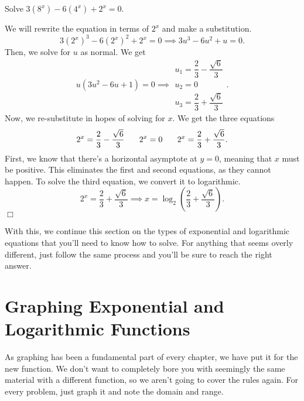 \documentclass[../book.tex]{subfiles}
\begin{document}
\begin{example}
Solve $3(8^x)-6(4^x)+2^x=0$.
\end{example}
\begin{solution}
We will rewrite the equation in terms of $2^x$ and make a substitution.  $$3(2^x)^3-6(2^x)^2+2^x=0 \implies 3u^3-6u^2+u=0.$$  Then, we solve for $u$ as normal.  We get $$u(3u^2-6u+1)=0 \implies \begin{matrix} u_1=\dfrac{2}{3}-\dfrac{\sqrt{6}}{3} \\ u_2=0 \\ u_3=\dfrac{2}{3}+\dfrac{\sqrt{6}}{3} \end{matrix}.$$
Now, we re-substitute in hopes of solving for $x$. We get the three equations $$2^x=\dfrac{2}{3}-\dfrac{\sqrt{6}}{3} \hspace{0.25in} 2^x=0 \hspace{0.25in} 2^x=\dfrac{2}{3}+\dfrac{\sqrt{6}}{3}.$$
First, we know that there's a horizontal asymptote at $y=0$, meaning that $x$ must be positive.  This eliminates the first and second equations, as they cannot happen.  To solve the third equation, we convert it to logarithmic.  $$2^x=\dfrac{2}{3}+\dfrac{\sqrt{6}}{3} \implies x=\log_2\left(\dfrac{2}{3}+\dfrac{\sqrt{6}}{3}\right).$$ $\Box$
\end{solution}
With this, we continue this section on the types of exponential and logarithmic equations that you'll need to know how to solve.  For anything that seems overly different, just follow the same process and you'll be sure to reach the right answer.
\section{Graphing Exponential and Logarithmic Functions}
\noindent As graphing has been a fundamental part of every chapter, we have put it for the new function.  We don't want to completely bore you with seemingly the same material with a different function, so we aren't going to cover the rules again.  For every problem, just graph it and note the domain and range.
\end{document}
